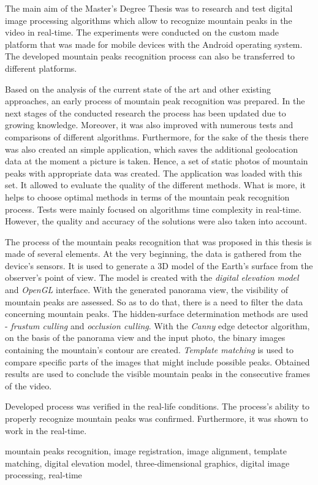 \newpage

\abstract

The main aim of the Master's Degree Thesis was to research and test digital image processing algorithms which allow to recognize mountain peaks in the video in real-time. The experiments were conducted on the custom made platform that was made for mobile devices with the Android operating system. The developed mountain peaks recognition process can also be transferred to different platforms.

Based on the analysis of the current state of the art and other existing approaches, an early process of mountain peak recognition was prepared. In the next stages of the conducted research the process has been updated due to growing knowledge. Moreover, it was also improved with numerous tests and comparisons of different algorithms. Furthermore, for the sake of the thesis there was also created an simple application, which saves the additional geolocation data at the moment a picture is taken. Hence, a set of static photos of mountain peaks with appropriate data was created. The application was loaded with this set. It allowed to evaluate the quality of the different methods. What is more, it helps to choose optimal methods in terms of the mountain peak recognition process. Tests were mainly focused on algorithms time complexity in real-time. However, the quality and accuracy of the solutions were also taken into account.

The process of the mountain peaks recognition that was proposed in this thesis is made of several elements. At the very beginning, the data is gathered from the device's sensors. It is used to generate a 3D model of the Earth's surface from the observer's point of view. The model is created with the \textit{digital elevation model} and \textit{OpenGL} interface. With the generated panorama view, the visibility of mountain peaks are assessed. So as to do that, there is a need to filter the data concerning mountain peaks. The hidden-surface determination methods are used - \textit{frustum culling} and \textit{occlusion culling}. With the \textit{Canny} edge detector algorithm, on the basis of the panorama view and the input photo, the binary images containing the mountain's contour are created. \textit{Template matching} is used to compare specific parts of the images that might include possible peaks. Obtained results are used to conclude the visible mountain peaks in the consecutive frames of the video.

Developed process was verified in the real-life conditions. The process's ability to properly recognize mountain peaks was confirmed. Furthermore, it was shown to work in the real-time.


\keywords mountain peaks recognition, image registration, image alignment, template matching, digital elevation model, three-dimensional graphics, digital image processing, real-time